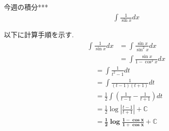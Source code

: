 \documentclass[main]{subfiles}
\begin{document}

\begin{mondai}{5}{今週の積分}{***}
    \begin{align*}
        \int \frac{1}{\sin x} dx
    \end{align*}
\end{mondai}


\solutionhead
\hfill
以下に計算手順を示す.
\hfill\
\begin{align*}
    \int \frac{1}{\sin x} dx
        &= \int \frac{\sin x}{\sin^2 x} dx \\
        &= \int \frac{\sin x}{1-\cos^2 x} dx
\end{align*}
\begin{align*}
        &= \int \frac{1}{t^2-1} dt \\
        &= \int \frac{1}{(t-1)(t+1)} dt \\
        &= \frac{1}{2}\int \left(\frac{1}{t-1}-\frac{1}{t+1}\right) dt \\
        &= \frac{1}{2} \log \left|\frac{t-1}{t+1}\right|+\mathbb{C}  \\
        &= \boldsymbol{\frac{1}{2} \log \frac{1-\cos x}{1+\cos x}+\mathbb{C}}
\end{align*}
\end{document}
